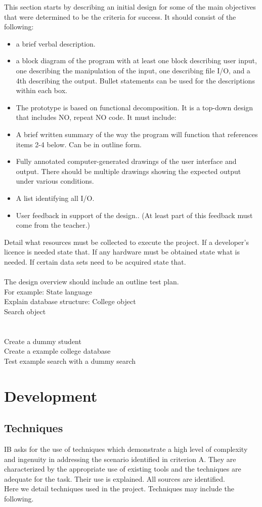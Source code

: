 \documentclass{tufte-book}
\begin{document}
This section starts by describing an initial design for some of the main objectives that were determined to be the criteria for success. It should consist of the following:
\begin{itemize}
\item a brief verbal description.
\item a block diagram of the program with at least one block describing user input, one describing the manipulation of the input, one describing file I/O, and a 4th describing the output. Bullet statements can be used for the descriptions within each box.
\item The prototype is based on functional decomposition. It is a top-down design that includes NO, repeat NO code. It must include:
\item A brief written summary of the way the program will function that references items 2-4 below. Can be in outline form.
\item Fully annotated computer-generated drawings of the user interface and output. There should be multiple drawings showing the expected output under various conditions.
\item A list identifying all I/O.
\item User feedback in support of the design.. (At least part of this feedback must come from the teacher.)
\end{itemize}

Detail what resources must be collected to execute the project.  If a developer's licence is needed state that.  If any hardware must be obtained state what is needed.  If certain data sets need to be acquired state that.\\ \ \\

The design overview should include an outline test plan.  \\
For example:
State language\\
Explain database structure: College object\\
Search object\\
\\ \ \\
Create a dummy student\\
Create a example college database\\
Test example search with a dummy search
\chapter{Development}
\section{Techniques}
IB asks for the use of techniques which demonstrate a high level of complexity and ingenuity in addressing the scenario identified in criterion A. They are characterized by the appropriate use of existing tools and the techniques are adequate for the task. Their use is explained. All sources are identified.\\
Here we detail techniques used in the project.  Techniques may include the following.
\end{document}
